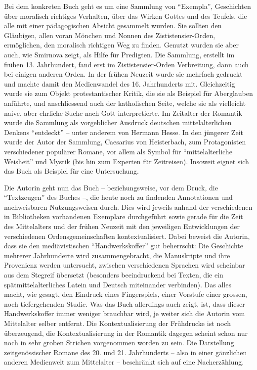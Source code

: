 \documentclass[a4paper,
fontsize=11pt,
oneside,
numbers=noperiodatend,
parskip=half-,
bibliography=totoc,
final
]{scrartcl}
\begin{document}
Bei dem konkreten Buch geht es um eine Sammlung von \enquote{Exempla},
Geschichten über moralisch richtiges Verhalten, über das Wirken Gottes
und des Teufels, die alle mit einer pädagogischen Absicht gesammelt
wurden. Sie sollten den Gläubigen, allen voran Mönchen und Nonnen des
Zististensier-Orden, ermöglichen, den moralisch richtigen Weg zu finden.
Genutzt wurden sie aber auch, wie Smirnova zeigt, als Hilfe für
Predigten. Die Sammlung, erstellt im frühen 13. Jahrhundert, fand erst
im Zististensier-Orden Verbreitung, dann auch bei einigen anderen Orden.
In der frühen Neuzeit wurde sie mehrfach gedruckt und machte damit den
Medienwandel des 16. Jahrhunderts mit. Gleichzeitig wurde sie zum Objekt
protestantischer Kritik, die sie als Beispiel für Aberglauben anführte,
und anschliessend auch der katholischen Seite, welche sie als vielleicht
naive, aber ehrliche Suche nach Gott interpretierte. Im Zeitalter der
Romantik wurde die Sammlung als vorgeblicher Ausdruck deutschen
mittelalterlichen Denkens \enquote{entdeckt} -- unter anderem von
Hermann Hesse. In den jüngerer Zeit wurde der Autor der Sammlung,
Caesarius von Heisterbach, zum Protagonisten verschiedener populärer
Romane, vor allem als Symbol für \enquote{mittelalterliche Weisheit} und
Mystik (bis hin zum Experten für Zeitreisen). Insoweit eignet sich das
Buch als Beispiel für eine Untersuchung.

Die Autorin geht nun das Buch -- beziehungsweise, vor dem Druck, die
\enquote{Textzeugen} des Buches --, die heute noch zu findenden
Annotationen und nachweisbaren Nutzungsweisen durch. Dies wird jeweils
anhand der verschiedenen in Bibliotheken vorhandenen Exemplare
durchgeführt sowie gerade für die Zeit des Mittelalters und der frühen
Neuzeit mit den jeweiligen Entwicklungen der verschiedenen
Ordensgemeinschaften kontextualisiert. Dabei beweist die Autorin, dass
sie den mediävistischen \enquote{Handwerkskoffer} gut beherrscht: Die
Geschichte mehrerer Jahrhunderte wird zusammengebracht, die Manuskripte
und ihre Provenienz werden untersucht, zwischen verschiedenen Sprachen
wird scheinbar aus dem Stegreif übersetzt (besonders beeindruckend bei
Texten, die ein spätmittelalterliches Latein und Deutsch miteinander
verbinden). Das alles macht, wie gesagt, den Eindruck eines
Fingerspiels, einer Vorstufe einer grossen, noch tiefergehenden Studie.
Was das Buch allerdings auch zeigt, ist, dass dieser Handwerkskoffer
immer weniger brauchbar wird, je weiter sich die Autorin vom Mittelalter
selber entfernt. Die Kontextualisierung der Frühdrucke ist noch
überzeugend, die Kontextualisierung in der Romantik dagegen scheint
schon nur noch in sehr groben Strichen vorgenommen worden zu sein. Die
Darstellung zeitgenössischer Romane des 20. und 21. Jahrhunderts -- also
in einer gänzlichen anderen Medienwelt zum Mittelalter -- beschränkt
sich auf eine Nacherzählung.
\end{document}
